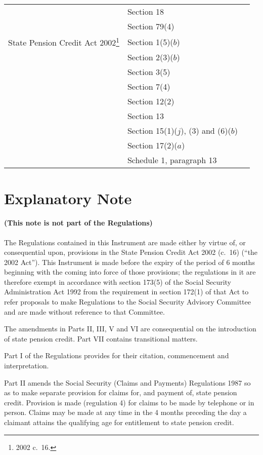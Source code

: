 \documentclass[12pt,a4paper]{article}
\begin{document}
{\begin{longtable}{p{66.02693pt}p{59.43776pt}p{228.52734pt}}
&Section 18
\\
&Section 79(4)\\
State Pension Credit Act 2002\footnote{2002 c.\ 16.}&
Section 1(5)($b$) 
\\&
Section 2(3)($b$) 
\\&
Section 3(5)
\\&
Section 7(4)
\\&
Section 12(2)
\\&
Section 13
\\&
Section 15(1)($j$), (3) and (6)($b$) 
\\&
Section 17(2)($a$) 
\\&
Schedule 1, paragraph 13\\
\end{longtable}

}
	
\part{Explanatory Note}

\renewcommand\parthead{— Explanatory Note}

\subsection*{(This note is not part of the Regulations)}

The Regulations contained in this Instrument are made either by virtue of, or consequential upon, provisions in the State Pension Credit Act 2002 (c.\ 16) (“the 2002 Act”). This Instrument is made before the expiry of the period of 6 months beginning with the coming into force of those provisions; the regulations in it are therefore exempt in accordance with section 173(5) of the Social Security Administration Act 1992 from the requirement in section 172(1) of that Act to refer proposals to make Regulations to the Social Security Advisory Committee and are made without reference to that Committee.

The amendments in Parts II, III, V and VI are consequential on the introduction of state pension credit. Part VII contains transitional matters.

Part I of the Regulations provides for their citation, commencement and interpretation.

Part II amends the Social Security (Claims and Payments) Regulations 1987 so as to make separate provision for claims for, and payment of, state pension credit. Provision is made (regulation 4) for claims to be made by telephone or in person. Claims may be made at any time in the 4 months preceding the day a claimant attains the qualifying age for entitlement to state pension credit.
\end{document}
